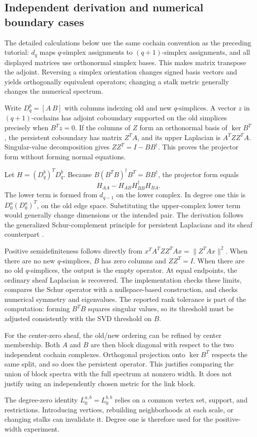 \subsection{Independent derivation and numerical boundary cases}
\label{sec:persistent_details}
The detailed calculations below use the same cochain convention as the preceding tutorial: $d_q$ maps $q$-simplex assignments to $(q+1)$-simplex assignments, and all displayed matrices use orthonormal simplex bases. This makes matrix transpose the adjoint. Reversing a simplex orientation changes signed basis vectors and yields orthogonally equivalent operators; changing a stalk metric generally changes the numerical spectrum.

Write $D_q^b=[A\ B]$ with columns indexing old and new $q$-simplices. A vector $z$ in $(q+1)$-cochains has adjoint coboundary supported on the old simplices precisely when $B^Tz=0$. If the columns of $Z$ form an orthonormal basis of $\ker B^T$, the persistent coboundary has matrix $Z^TA$, and its upper Laplacian is $A^TZZ^TA$. Singular-value decomposition gives $ZZ^T=I-BB^\dagger$. This proves the projector form without forming normal equations.

Let $H=(D_q^b)^TD_q^b$. Because $B(B^TB)^\dagger B^T=BB^\dagger$, the projector form equals
\begin{equation}
H_{AA}-H_{AB}H_{BB}^\dagger H_{BA}.
\end{equation}
The lower term is formed from $d_{q-1}$ on the lower complex. In degree one this is $D_0^a(D_0^a)^T$, on the old edge space. Substituting the upper-complex lower term would generally change dimensions or the intended pair. The derivation follows the generalized Schur-complement principle for persistent Laplacians and its sheaf counterpart \citep{memoli2022,wei2025}.

Positive semidefiniteness follows directly from $x^TA^TZZ^TAx=\|Z^TAx\|^2$. When there are no new $q$-simplices, $B$ has zero columns and $ZZ^T=I$. When there are no old $q$-simplices, the output is the empty operator. At equal endpoints, the ordinary sheaf Laplacian is recovered. The implementation checks these limits, compares the Schur operator with a nullspace-based construction, and checks numerical symmetry and eigenvalues. The reported rank tolerance is part of the computation: forming $B^TB$ squares singular values, so its threshold must be adjusted consistently with the SVD threshold on $B$.

For the center-zero sheaf, the old/new ordering can be refined by center membership. Both $A$ and $B$ are then block diagonal with respect to the two independent cochain complexes. Orthogonal projection onto $\ker B^T$ respects the same split, and so does the persistent operator. This justifies comparing the union of block spectra with the full spectrum at nonzero width. It does not justify using an independently chosen metric for the link block.

The degree-zero identity $L_0^{a,b}=L_0^{b,b}$ relies on a common vertex set, support, and restrictions. Introducing vertices, rebuilding neighborhoods at each scale, or changing stalks can invalidate it. Degree one is therefore used for the positive-width experiment.
